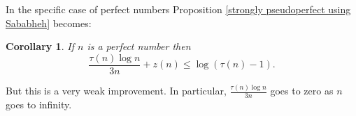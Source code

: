 \documentclass{article}
\newtheorem{corollary}[theorem]{Corollary}
\begin{document}
In the specific case of perfect numbers Proposition \ref{strongly pseudoperfect using Sababheh} becomes:

\begin{corollary} If $n$ is a perfect number then $$\frac{\tau(n)\log n}{3n}  + z(n) \leq \log (\tau(n)-1).$$
\end{corollary}

But this is a very weak improvement. In particular,  $\frac{\tau(n)\log n}{3n}$ goes to zero as $n$ goes to infinity.










\end{document}
